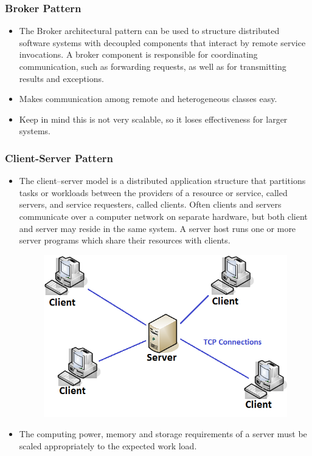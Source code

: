 \documentclass[a4paper]{article}
\begin{document}
\subsubsection{Broker Pattern}
\begin{itemize}
\item The Broker architectural pattern can be used to structure distributed software systems with decoupled components that interact by remote service invocations. A broker component is responsible for coordinating communication, such as forwarding requests, as well as for transmitting results and exceptions.
\item Makes communication among remote and heterogeneous classes easy.
\item Keep in mind this is not very scalable, so it loses effectiveness for larger systems.
\end{itemize}

\subsubsection{Client-Server Pattern}
\begin{itemize}
\item The client–server model is a distributed application structure that partitions tasks or workloads between the providers of a resource or service, called servers, and service requesters, called clients. Often clients and servers communicate over a computer network on separate hardware, but both client and server may reside in the same system. A server host runs one or more server programs which share their resources with clients.

\begin{figure}[h]
\centering 
\includegraphics[scale=0.5]{images/client_server.png}
\end{figure}

\item The computing power, memory and storage requirements of a server must be scaled appropriately to the expected work load.

\end{itemize}
\end{document}

